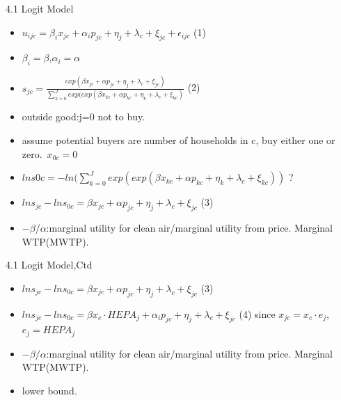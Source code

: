 \documentclass[10pt]{beamer}
\begin{document}
\begin{frame}{4.1 Logit Model}
    \begin{itemize}
        \item $u_{ijc}=\beta_{i}x_{jc}+\alpha_{i}p_{jc}+\eta_j+\lambda_c+\xi_{jc}+\epsilon_{ijc}$ (1)
        \item $\beta_i=\beta$,$\alpha_i=\alpha$
        \item $s_{jc}=\frac{exp(\beta x_{jc}+\alpha p_{jc}+\eta_j+\lambda_c+\xi_{jc})}{\sum_{k=0}^J exp(exp(\beta x_{kc}+\alpha p_{kc}+\eta_k+\lambda_c+\xi_{kc})}$ (2)
        \item outside good:j=0 not to buy.
        \item assume potential buyers are number of households in c, buy either one or zero.\
        $x_{0c}=0$
        \item $lns{0c} = -ln(\sum_{k=0}^J exp(exp(\beta x_{kc}+\alpha p_{kc}+\eta_k+\lambda_c+\xi_{kc}))$ ?
        \item $lns_{jc}-lns_{0c}=\beta x_{jc}+\alpha p_{jc}+\eta_j+\lambda_c+\xi_{jc}$ (3)
        \item $-\beta/\alpha$:marginal utility for clean air/marginal utility from price. Marginal WTP(MWTP).
    \end{itemize}
\end{frame}

\begin{frame}{4.1 Logit Model,Ctd}
    \begin{itemize}
        \item $lns_{jc}-lns_{0c}=\beta x_{jc}+\alpha p_{jc}+\eta_j+\lambda_c+\xi_{jc}$ (3)
        \item $lns_{jc}-lns_{0c}=\beta x_{c}\cdot HEPA_{j}+\alpha_{i}p_{jc}+\eta_j+\lambda_c+\xi_{jc}$ (4) since $x_{jc}=x_c\cdot e_j$,$e_j=HEPA_j$
        \item $-\beta/\alpha$:marginal utility for clean air/marginal utility from price. Marginal WTP(MWTP).
        \item lower bound.
    \end{itemize}
\end{frame}
\end{document}
